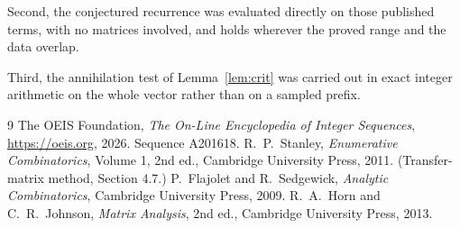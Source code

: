\documentclass[11pt,a4paper]{article}
\theoremstyle{plain}
\theoremstyle{definition}
\begin{document}
Second, the conjectured recurrence was evaluated directly on those published terms, with no
matrices involved, and holds wherever the proved range and the data overlap.

Third, the annihilation test of Lemma~\ref{lem:crit} was carried out in exact integer
arithmetic on the whole vector rather than on a sampled prefix.

\begin{thebibliography}{9}
 The OEIS Foundation, \emph{The On-Line Encyclopedia of Integer
Sequences}, \url{https://oeis.org}, 2026. Sequence A201618.
 R.~P.~Stanley, \emph{Enumerative Combinatorics}, Volume 1, 2nd ed.,
Cambridge University Press, 2011. (Transfer-matrix method, Section 4.7.)
 P.~Flajolet and R.~Sedgewick, \emph{Analytic Combinatorics}, Cambridge
University Press, 2009.
 R.~A.~Horn and C.~R.~Johnson, \emph{Matrix Analysis}, 2nd ed., Cambridge
University Press, 2013.
\end{thebibliography}
\end{document}
